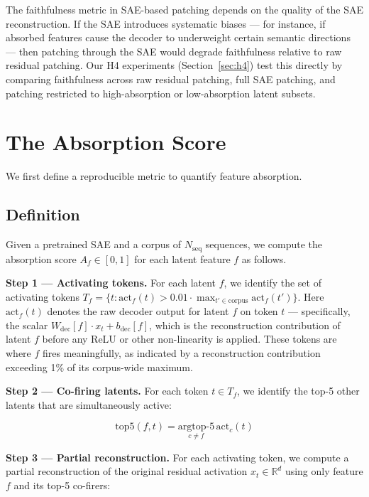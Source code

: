 \documentclass{article}
\begin{document}
The faithfulness metric in SAE-based patching depends on the quality of the SAE reconstruction. If the SAE introduces systematic biases --- for instance, if absorbed features cause the decoder to underweight certain semantic directions --- then patching through the SAE would degrade faithfulness relative to raw residual patching. Our H4 experiments (Section~\ref{sec:h4}) test this directly by comparing faithfulness across raw residual patching, full SAE patching, and patching restricted to high-absorption or low-absorption latent subsets.


\section{The Absorption Score}
\label{sec:absorption_score}

We first define a reproducible metric to quantify feature absorption.

\subsection{Definition}

Given a pretrained SAE and a corpus of $N_{\text{seq}}$ sequences, we compute the absorption score $A_f \in [0, 1]$ for each latent feature $f$ as follows.

\textbf{Step 1 --- Activating tokens.} For each latent $f$, we identify the set of activating tokens $T_f = \{t : \text{act}_f(t) > 0.01 \cdot \max_{t' \in \text{corpus}} \text{act}_f(t')\}$. Here $\text{act}_f(t)$ denotes the raw decoder output for latent $f$ on token $t$ --- specifically, the scalar $W_{\text{dec}}[f] \cdot x_t + b_{\text{dec}}[f]$, which is the reconstruction contribution of latent $f$ before any ReLU or other non-linearity is applied. These tokens are where $f$ fires meaningfully, as indicated by a reconstruction contribution exceeding 1\% of its corpus-wide maximum.

\textbf{Step 2 --- Co-firing latents.} For each token $t \in T_f$, we identify the top-5 other latents that are simultaneously active:

\begin{equation}
\text{top5}(f, t) = \underset{c \neq f}{\text{argtop-5}} \, \text{act}_c(t)
\end{equation}

\textbf{Step 3 --- Partial reconstruction.} For each activating token, we compute a partial reconstruction of the original residual activation $x_t \in \mathbb{R}^d$ using only feature $f$ and its top-5 co-firers:
\end{document}
